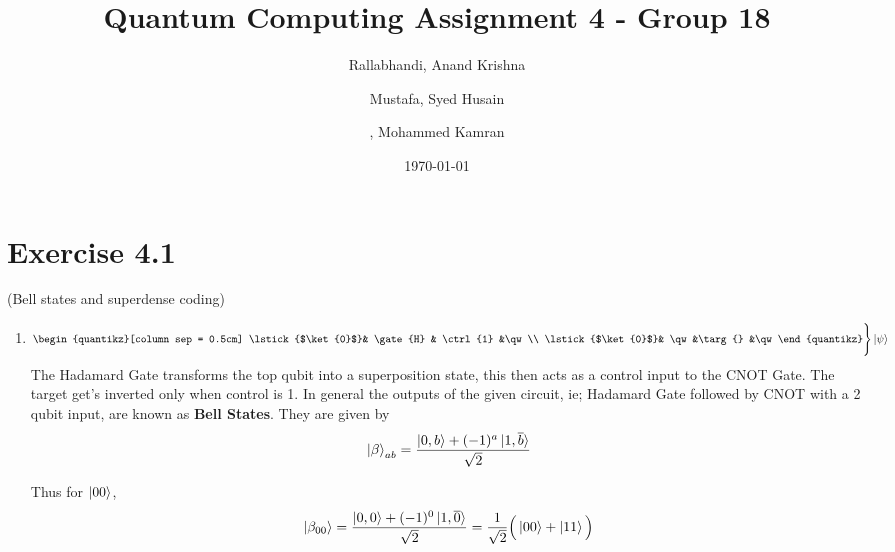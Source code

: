 \documentclass[a4paper,12pt]{article}
\title{Quantum Computing Assignment 4 - Group 18}
\author{
    Rallabhandi, Anand Krishna 
    \and
    Mustafa, Syed Husain
    \and
     , Mohammed Kamran 
}
\date{\today}
\begin{document}
\maketitle

\section*{Exercise 4.1}

 (Bell states and superdense coding)

\begin{enumerate}[label=(\alph*)]
    \item
    \[\begin{quantikz}[column sep = 0.5cm]
        \lstick{$\ket{0}$}& \gate{H} & \ctrl{1} &\qw \\
        \lstick{$\ket{0}$}& \qw      &\targ{}   &\qw
    \end{quantikz} \vspace{2mm} \Bigg\} \ket{\psi} \]
\linebreak
The Hadamard Gate transforms the top qubit into a superposition state, this then acts as a control input to the CNOT Gate. The target get's inverted only when control is 1.
In general the outputs of the given circuit, ie; Hadamard Gate followed by CNOT with a 2 qubit input, are known as \textbf{Bell States}. They are given by
\[\ket{\beta}_{ab} = \frac{\ket{0, b}+(-1)^{a}\ket{1,\overline{b}}}{\sqrt{2}}\]

Thus for $\ket{00}$, \[\ket{\beta_{00}} = \frac{\ket{0, 0}+(-1)^{0}\ket{1,\overline{0}}}{\sqrt{2}} = \frac{1}{\sqrt{2}}\Big(\ket{00}+ \ket{11}\Big)\] \\~\\


\end{enumerate}
\end{document}
